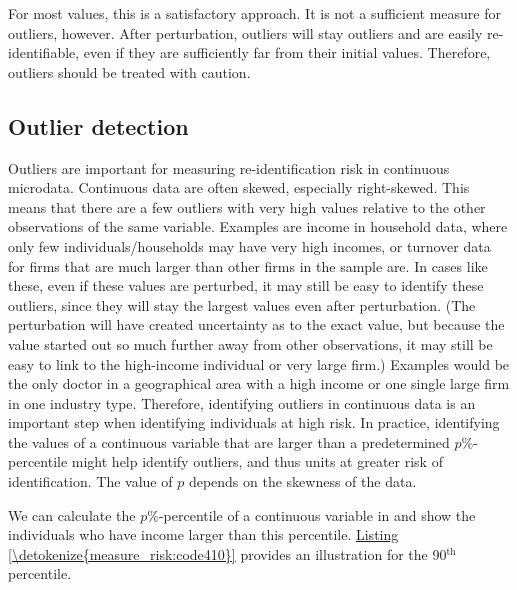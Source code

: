 \documentclass[letterpaper,10pt,english]{sphinxmanual}
\begin{document}
For most values, this is a satisfactory approach. It is not a sufficient
measure for outliers, however. After perturbation, outliers will stay
outliers and are easily re-identifiable, even if they are sufficiently
far from their initial values. Therefore, outliers should be treated
with caution.


\subsection{Outlier detection}
\label{\detokenize{measure_risk:outlier-detection}}
Outliers are important for measuring re-identification risk in
continuous microdata. Continuous data are often skewed, especially
right-skewed. This means that there are a few outliers with very high
values relative to the other observations of the same variable. Examples
are income in household data, where only few individuals/households may
have very high incomes, or turnover data for firms that are much larger
than other firms in the sample are. In cases like these, even if these
values are perturbed, it may still be easy to identify these outliers,
since they will stay the largest values even after perturbation. (The
perturbation will have created uncertainty as to the exact value, but
because the value started out so much further away from other
observations, it may still be easy to link to the high-income individual
or very large firm.) Examples would be the only doctor in a
geographical area with a high income or one single large firm in one
industry type. Therefore, identifying outliers in continuous data is an
important step when identifying individuals at high risk. In practice,
identifying the values of a continuous variable that are larger than a
predetermined \(p\%\)-percentile might help identify outliers, and
thus units at greater risk of identification. The value of \(p\)
depends on the skewness of the data.

We can calculate the \(p\%\)-percentile of a continuous variable in
 and show the individuals who have income larger than this
percentile. \hyperref[\detokenize{measure_risk:code410}]{Listing \ref{\detokenize{measure_risk:code410}}} provides an illustration for the 90$^{\text{th}}$
percentile.
\end{document}
